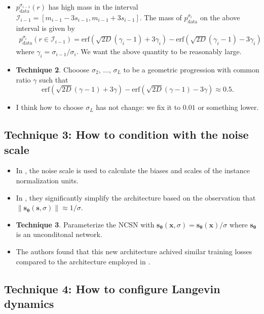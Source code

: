 \documentclass[10pt]{article}
\newcommand{\ve}[1]{\mathbf{#1}}
\newcommand{\mrm}[1]{\mathrm{#1}}
\newcommand{\ves}[1]{\boldsymbol{#1}}
\newcommand{\mcal}[1]{\mathcal{#1}}
\begin{document}
\begin{itemize}
  \item $p_{\mrm{data}}^{\sigma_{i-1}}(r)$ has high mass in the interval $\mcal{I}_{i-1} = [m_{i-1} - 3s_{i-1}, m_{i-1} + 3s_{i-1}]$. The mass of $p_{\mrm{data}}^{\sigma_i}$ on the above interval is given by
  \begin{align*}
    p_{\mrm{data}}^{\sigma_i}(r \in \mcal{I}_{i-1}) 
    = \mrm{erf}(\sqrt{2D}(\gamma_i - 1) + 3\gamma_i) - \mrm{erf}(\sqrt{2D}(\gamma_i - 1) - 3\gamma_i)
  \end{align*}
  where $\gamma_i = \sigma_{i-1} / \sigma_i$. We want the above quantity to be reasonably large.

  \item {\bf Technique 2}. Chooose $\sigma_2$, $\dotsc$, $\sigma_L$ to be a geometric progression with common ratio $\gamma$ such that $$\mrm{erf}(\sqrt{2D}(\gamma - 1) + 3\gamma) - \mrm{erf}(\sqrt{2D}(\gamma - 1) - 3\gamma) \approx 0.5.$$
  
  \item I think how to choose $\sigma_L$ has not change: we fix it to $0.01$ or something lower.
\end{itemize}

\subsection{Technique 3: How to condition with the noise scale}

\begin{itemize}
  \item In \cite{Song:2019}, the noise scale is used to calculate the biases and scales of the instance normalization units.
  
  \item In \cite{Song:2020}, they significantly simplify the architecture based on the observation that $\| \ve{s}_{\ves{\theta}}(\ve{s},\sigma)  \| \approx 1/\sigma$.
  
  \item {\bf Technique 3}. Parameterize the NCSN with $\ve{s}_{\ves{\theta}}(\ve{x},\sigma) = \ve{s}_{\ves{\theta}}(\ve{x})/\sigma$ where $\ve{s}_{\ves{\theta}}$ is an unconditonal network.

  \item The authors found that this new architecture achived similar training losses compared to the architecture employed in \cite{Song:2019}.
\end{itemize}

\subsection{Technique 4: How to configure Langevin dynamics}
\end{document}
